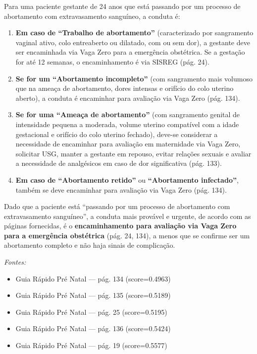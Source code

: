 \documentclass[conference,a4paper]{IEEEtran}
\begin{document}
Para uma paciente gestante de 24 anos que está passando por um
processo de abortamento com extravasamento sanguíneo, a conduta
é:
\begin{enumerate}
  \item \textbf{Em caso de ``Trabalho de abortamento''}
        (caracterizado por sangramento vaginal ativo, colo
        entreaberto ou dilatado, com ou sem dor), a gestante deve
        ser encaminhada via Vaga Zero para a emergência
        obstétrica. Se a gestação for até 12 semanas, o
        encaminhamento é via SISREG (pág. 24).
  \item \textbf{Se for um ``Abortamento incompleto''} (com
        sangramento mais volumoso que na ameaça de abortamento,
        dores intensas e orifício do colo uterino aberto), a
        conduta é encaminhar para avaliação via Vaga Zero
        (pág. 134).
  \item \textbf{Se for uma ``Ameaça de abortamento''} (com
        sangramento genital de intensidade pequena a moderada,
        volume uterino compatível com a idade gestacional e
        orifício do colo uterino fechado), deve-se considerar a
        necessidade de encaminhar para avaliação em maternidade
        via Vaga Zero, solicitar USG, manter a gestante em
        repouso, evitar relações sexuais e avaliar a necessidade
        de analgésicos em caso de dor significativa (pág. 133).
  \item \textbf{Em caso de ``Abortamento retido''} ou
        \textbf{``Abortamento infectado''}, também se deve
        encaminhar para avaliação via Vaga Zero (pág. 134).
\end{enumerate}

Dado que a paciente está ``passando por um processo de
abortamento com extravasamento sanguíneo'', a conduta mais
provável e urgente, de acordo com as páginas fornecidas, é o
\textbf{encaminhamento para avaliação via Vaga Zero para a
emergência obstétrica} (pág. 24, 134), a menos que se confirme
ser um abortamento completo e não haja sinais de complicação.

\textit{Fontes:}
\begin{itemize}
  \item {Guia Rápido Pré Natal} --- pág. 134 (score=0.4963)
  \item {Guia Rápido Pré Natal} --- pág. 135 (score=0.5189)
  \item {Guia Rápido Pré Natal} --- pág. 25 (score=0.5195)
  \item {Guia Rápido Pré Natal} --- pág. 136 (score=0.5424)
  \item {Guia Rápido Pré Natal} --- pág. 19 (score=0.5577)
\end{itemize}
\end{document}
